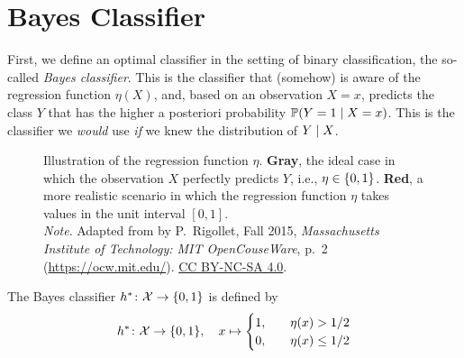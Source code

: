 \section{Bayes Classifier}

First, we define an optimal classifier in the setting of binary classification, the so-called \emph{Bayes classifier}. This is the classifier that (somehow) is aware of the regression function $\eta(X)$, and, based on an observation $X = x$, predicts the class $Y$ that has the higher a posteriori probability $\mathbb{P}(Y = 1 \mathrel{|} X = x)$. This is the classifier we \emph{would} use \emph{if} we knew the distribution of $Y \mathrel{|} X$.

\begin{figure}
    \centering
    \caption{%
        Illustration of the regression function $\eta$. \textcolor{dark-gray}{\textbf{Gray}}, the ideal case in which the observation $X$ perfectly predicts $Y$, i.e., $\eta \in \set{0, 1}$. \textcolor{dark-red}{\textbf{Red}}, a more realistic scenario in which the regression function $\eta$ takes values in the unit interval $[0, 1]$. \\
        \indent\emph{Note}. Adapted from  by P.~Rigollet, Fall 2015, \emph{Massachusetts Institute of Technology: MIT OpenCouseWare}, p.~2 (\url{https://ocw.mit.edu/}). \href{https://creativecommons.org/licenses/by-nc-sa/4.0/}{CC BY-NC-SA 4.0}.
    }
    \label{fig: regression function}
\end{figure}

\begin{definition}
The Bayes classifier $h^* \colon \mathcal{X} \to \set{0,1}$ is defined by
\[
    h^* \colon \mathcal{X} \to \set{0, 1}, \quad x \mapsto \begin{cases}
        1, \quad & \eta(x) > 1/2 \\
        0, \quad & \eta(x) \leq 1/2
    \end{cases}
\]
\end{definition}

